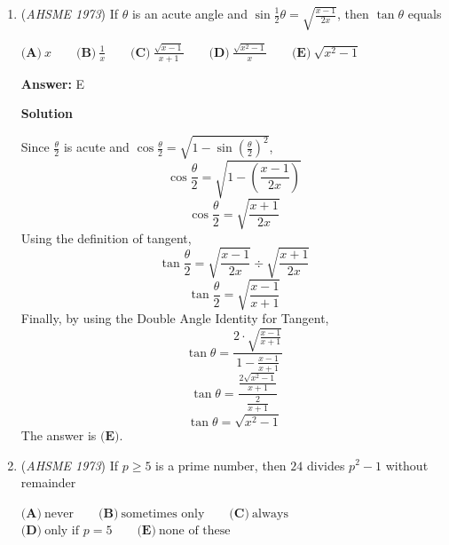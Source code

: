 \begin{enumerate}
 \textbf{Answer: }B



\textbf{Solution}

Let $n$ be the number of sides in the polygon.  The number of interior angles in the polygon is $180(n-2)$.  We know that the sum of all but one of them is $2190^{\circ}$, so the sum of all the angles is more than that.
 \[180(n-2) > 2190\]
 \[n-2 > 12 \frac{1}{6}\]
 \[n > 14 \frac{1}{6}\]

 The sum of the angles in a 15-sided polygon is $2340^{\circ}$, making the remaining angle $150^{\circ}$.  The angles of a convex polygon are all less than $180^{\circ}$, and since adding one more side means adding $180^{\circ}$ to the measure of the remaining angle, we can confirm that there are $\boxed{\textbf{(B)}\ 15}$ sides in the polygon.

 


	\item (\textit{AHSME 1973}) If $\theta$ is an acute angle and $\sin \frac12 \theta = \sqrt{\frac{x-1}{2x}}$, then $\tan \theta$ equals 


 $\textbf{(A)}\ x \qquad \textbf{(B)}\ \frac1{x} \qquad \textbf{(C)}\ \frac{\sqrt{x-1}}{x+1} \qquad \textbf{(D)}\ \frac{\sqrt{x^2-1}}{x} \qquad \textbf{(E)}\ \sqrt{x^2-1}$

 \textbf{Answer: }E



\textbf{Solution}

Since $\frac{\theta}{2}$ is acute and $\cos \frac{\theta}{2} = \sqrt{1 - \sin (\frac{\theta}{2})^2}$,
 \[\cos \frac{\theta}{2} = \sqrt{1 - (\frac{x-1}{2x})}\]
 \[\cos \frac{\theta}{2} = \sqrt{\frac{x+1}{2x}}\]Using the definition of tangent,
 \[\tan \frac{\theta}{2} = \sqrt{\frac{x-1}{2x}} \div \sqrt{\frac{x+1}{2x}}\]
 \[\tan \frac{\theta}{2} = \sqrt{\frac{x-1}{x+1}}\]Finally, by using the Double Angle Identity for Tangent,
 \[\tan \theta = \frac{2 \cdot \sqrt{\frac{x-1}{x+1}}}{1 - \frac{x-1}{x+1}}\]
 \[\tan \theta = \frac{\frac{2\sqrt{x^2-1}}{x+1}}{\frac{2}{x+1}}\]
 \[\tan \theta = \sqrt{x^2-1}\]The answer is $\boxed{\textbf{(E)}}$.

 


	\item (\textit{AHSME 1973}) If $p \geq 5$ is a prime number, then $24$ divides $p^2 - 1$ without remainder 


 $\textbf{(A)}\ \text{never} \qquad \textbf{(B)}\ \text{sometimes only} \qquad \textbf{(C)}\ \text{always} \qquad$
$\textbf{(D)}\ \text{only if } p =5 \qquad \textbf{(E)}\ \text{none of these}$


\end{enumerate}
